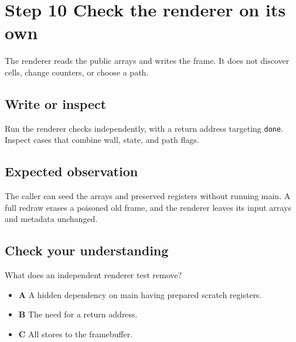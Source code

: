 \section{Step 10 Check the renderer on its own}\label{maze-s10}

The renderer reads the public arrays and writes the frame. It does not discover cells, change counters, or choose a path.

\subsection{Write or inspect}

Run the renderer checks independently, with a return address targeting \texttt{done}. Inspect cases that combine wall, state, and path flags.

\subsection{Expected observation}

The caller can seed the arrays and preserved registers without running main. A full redraw erases a poisoned old frame, and the renderer leaves its input arrays and metadata unchanged.

\subsection{Check your understanding}

What does an independent renderer test remove?

\begin{itemize}
  \item \textbf{A} A hidden dependency on main having prepared scratch registers.
  \item \textbf{B} The need for a return address.
  \item \textbf{C} All stores to the framebuffer.
\end{itemize}
